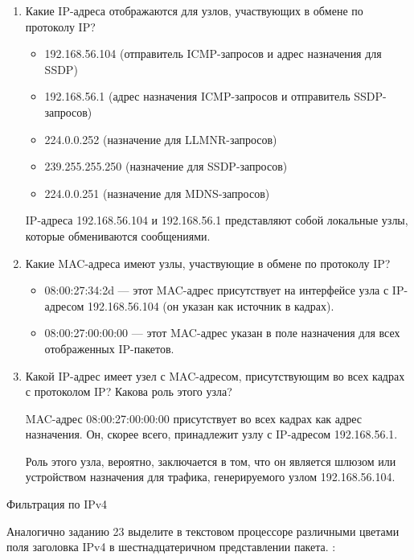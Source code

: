 \begin{enumerate}
	\item Какие IP-адреса отображаются для узлов,
		участвующих в обмене по протоколу IP? \par
		\begin{itemize}
			\item 192.168.56.104
				(отправитель ICMP-запросов и адрес назначения для SSDP)
			\item 192.168.56.1
				(адрес назначения ICMP-запросов и отправитель SSDP-запросов)
			\item 224.0.0.252 (назначение для LLMNR-запросов)
			\item 239.255.255.250 (назначение для SSDP-запросов)
			\item 224.0.0.251 (назначение для MDNS-запросов)
		\end{itemize}
		IP-адреса 192.168.56.104 и 192.168.56.1
		представляют собой локальные узлы, которые обмениваются сообщениями.
	\item Какие MAC-адреса имеют узлы, участвующие в обмене по протоколу IP?
		\begin{itemize}
			\item 08:00:27:34:2d --- этот MAC-адрес присутствует
				на интерфейсе узла с IP-адресом 192.168.56.104
				(он указан как источник в кадрах).
			\item 08:00:27:00:00:00 --- этот MAC-адрес указан
				в поле назначения для всех отображенных IP-пакетов.
		\end{itemize}
	\item Какой IP-адрес имеет узел с MAC-адресом,
		присутствующим во всех кадрах с протоколом IP?
		Какова роль этого узла? \par
		MAC-адрес 08:00:27:00:00:00 присутствует во всех кадрах
		как адрес назначения.
		Он, скорее всего, принадлежит узлу с IP-адресом 192.168.56.1. \par
		Роль этого узла, вероятно, заключается в том,
		что он является шлюзом или устройством назначения для трафика,
		генерируемого узлом 192.168.56.104.
\end{enumerate}

\begin{image}
	\caption{Фильтрация по IPv4}
	\label{fig:wrsh:ipv4}
\end{image}

Аналогично заданию 23 выделите в текстовом процессоре различными цветами
поля заголовка IPv4 в шестнадцатеричном представлении пакета.
:


